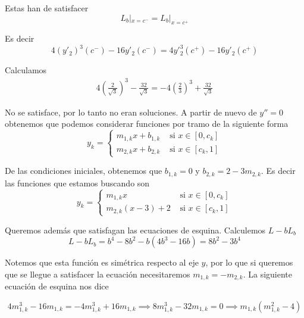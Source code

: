 \documentclass[a4paper,oneside,10.5pt]{USMArt}
\begin{document}
\begin{sol}
  Estas han de satisfacer
  \begin{equation*}
    L_{b}|_{x = c^{-}} = L_{b}|_{x = c^{+}}
  \end{equation*}

  Es decir
  \begin{equation*}
    4(y'_{2})^{3}(c^{-}) - 16y'_{2}(c^{-}) = 4y'_{2}^{3}(c^{+}) - 16y'_{2}(c^{+})
  \end{equation*}

  Calculamos
  \begin{align*}
    4(\frac{2}{\sqrt{3}})^{3} - \frac{32}{\sqrt{3}} = -4(\frac{2}{3})^{3} + \frac{32}{\sqrt3}
  \end{align*}

  No se satisface, por lo tanto no eran soluciones. A partir de nuevo de $y'' = 0$ obtenemos que podemos
  considerar funciones por tramo de la siguiente forma
  \begin{equation*}
    y_{k} = \begin{cases}
      m_{1,k} x + b_{1,k} & \text { si } x \in [0, c_{k}]\\
      m_{2,k} x + b_{2,k} & \text { si } x \in [c_{k}, 1]
    \end{cases}
  \end{equation*}

  De las condiciones iniciales, obtenemos que $b_{1,k} = 0$ y $b_{2, k} = 2 - 3m_{2,k}$. Es decir las funciones que
  estamos buscando son
  \begin{equation*}
    y_{k} = \begin{cases}
      m_{1,k} x & \text { si } x \in [0, c_{k}]\\
      m_{2,k} (x - 3) + 2 & \text { si } x \in [c_{k}, 1]
    \end{cases}
  \end{equation*}

  Queremos además que satisfagan las ecuaciones de esquina.
  Calculemos $L - bL_{b}$
  \begin{equation*}
    L - bL_{b} = b^{4} - 8b^{2} - b(4b^{3} - 16b) = 8b^{2}- 3b^{4}
  \end{equation*}

  Notemos que esta función es simétrica respecto al eje $y$, por lo que si queremos que se llegue a satisfacer
  la ecuación necesitaremos $m_{1,k} = -m_{2,k}$. La siguiente ecuación de esquina nos dice

  \begin{equation*}
    4m_{1,k}^{3} - 16m_{1,k} = -4m_{1,k}^{3} + 16m_{1,k} \implies 8m_{1,k}^{3} - 32m_{1,k} = 0 \implies m_{1,k}(m_{1,k}^{2} - 4)
  \end{equation*}


\end{sol}
\end{document}
